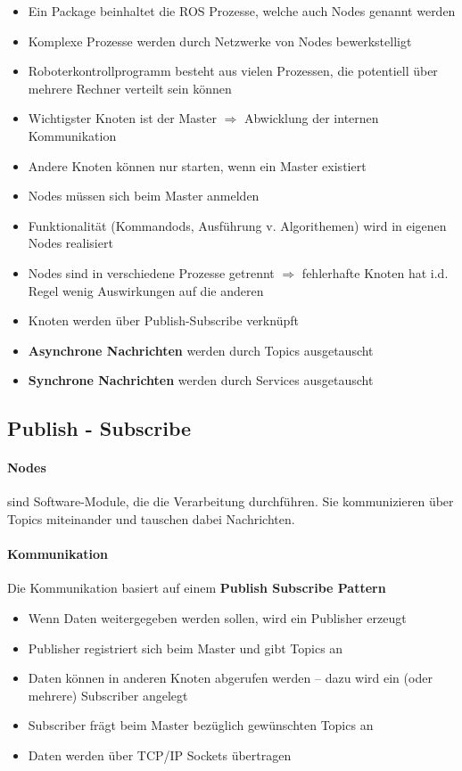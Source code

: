 \begin{itemize}
	\item Ein Package beinhaltet die ROS Prozesse, welche auch Nodes genannt werden
	\item Komplexe Prozesse werden durch Netzwerke von Nodes bewerkstelligt
	\item Roboterkontrollprogramm besteht aus vielen Prozessen, die potentiell über mehrere Rechner verteilt sein können
	\item Wichtigster Knoten ist der Master $\Rightarrow$ Abwicklung der internen Kommunikation
	\item Andere Knoten können nur starten, wenn ein Master existiert
	\item Nodes müssen sich beim Master anmelden
	\item Funktionalität (Kommandods, Ausführung v. Algorithemen) wird in eigenen Nodes realisiert
	\item Nodes sind in verschiedene Prozesse getrennt $\Rightarrow$ fehlerhafte Knoten hat i.d. Regel wenig Auswirkungen auf die anderen
	\item Knoten werden über Publish-Subscribe verknüpft
	\item \textbf{Asynchrone Nachrichten} werden durch Topics ausgetauscht
	\item \textbf{Synchrone Nachrichten} werden durch Services ausgetauscht
\end{itemize}
\subsection{Publish - Subscribe}
\paragraph{Nodes} sind Software-Module, die die Verarbeitung durchführen. Sie kommunizieren über Topics miteinander und tauschen dabei Nachrichten.
\paragraph{Kommunikation}
Die Kommunikation basiert auf einem \textbf{Publish Subscribe Pattern}
\begin{itemize}
	\item Wenn Daten weitergegeben werden sollen, wird ein Publisher erzeugt
	\item Publisher registriert sich beim Master und gibt Topics an
	\item Daten können in anderen Knoten abgerufen werden -- dazu wird ein (oder mehrere) Subscriber angelegt
	\item Subscriber frägt beim Master bezüglich gewünschten Topics an
	\item Daten werden über TCP/IP Sockets übertragen
\end{itemize}
